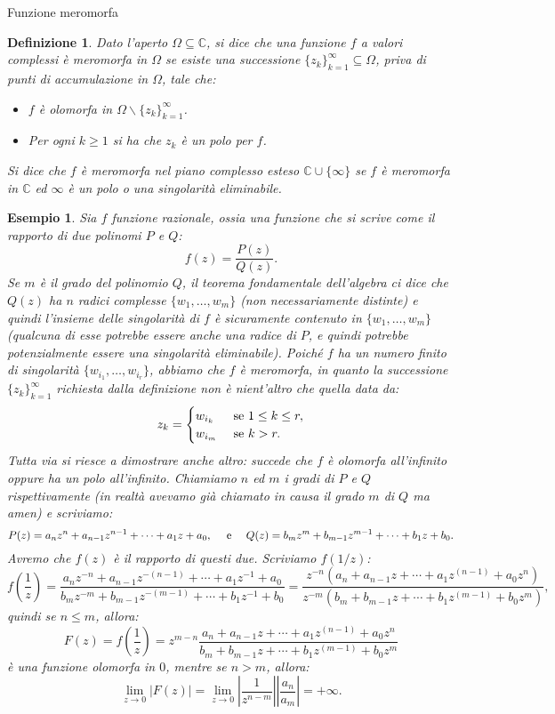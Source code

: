 \documentclass[11pt]{book}
\theoremstyle{Definizione}
\newtheorem*{mydef}{Definizione}
\theoremstyle{TeoremaProposizioneLemmaCorollarioCongettura}
\theoremstyle{OsservazioneNotaEsempio}
\newtheorem{myes}{Esempio}[section]
\newcommand{\C}{\mathbb{C}}
\newcommand{\tolto}{\smallsetminus}
\begin{document}
\begin{boxdef}{Funzione meromorfa}
\begin{mydef}
Dato l'aperto $\Omega \subseteq \C$, si dice che una funzione $f$ a valori complessi è meromorfa in $\Omega$ se esiste una successione $\{z_k\}_{k = 1}^\infty \subseteq \Omega$, priva di punti di accumulazione in $\Omega$, tale che:
\begin{itemize}
\item $f$ è olomorfa in $\Omega \tolto \{z_k\}_{k = 1}^\infty$.
\item Per ogni $k\geq 1$ si ha che $z_k$ è un polo per $f$.
\end{itemize}
Si dice che $f$ è meromorfa nel piano complesso esteso $\C \cup \{\infty\}$ se $f$ è meromorfa in $\C$ ed $\infty$ è un polo o una singolarità eliminabile.
\end{mydef}
\end{boxdef}
\begin{myes}
Sia $f$ funzione razionale, ossia una funzione che si scrive come il rapporto di due polinomi $P$ e $Q$:
$$
f(z) = \frac{P(z)}{Q(z)}.
$$
Se $m$ è il grado del polinomio $Q$, il teorema fondamentale dell'algebra ci dice che $Q(z)$ ha $n$ radici complesse $\{w_1,\dots,w_m\}$ (non necessariamente distinte) e quindi l'insieme delle singolarità di $f$ è sicuramente contenuto in $\{w_1,\dots,w_m\}$ (qualcuna di esse potrebbe essere anche una radice di $P$, e quindi potrebbe potenzialmente essere una singolarità eliminabile). Poiché $f$ ha un numero finito di singolarità $\{w_{i_1},\dots,w_{i_r}\}$, abbiamo che $f$ è meromorfa, in quanto la successione $\{z_k\}_{k = 1}^\infty$ richiesta dalla definizione non è nient'altro che quella data da:
$$
z_k = \begin{cases}
w_{i_k} &\textup{ se }1\leq k \leq r,\\
w_{i_m} &\textup{ se } k > r.
\end{cases}
$$
Tutta via si riesce a dimostrare anche altro: succede che $f$ è olomorfa all'infinito oppure ha un polo all'infinito. Chiamiamo $n$ ed $m$ i gradi di $P$ e $Q$ rispettivamente (in realtà avevamo già chiamato in causa il grado $m$ di $Q$ ma amen) e scriviamo:
$$
P(z) = a_n z^n + a_{n-1}z^{n-1} + \cdots + a_1 z + a_0,\quad \textup{ e }\quad Q(z) = b_mz^{m} + b_{m-1}z^{m-1} + \cdots + b_1 z + b_0.
$$
Avremo che $f(z)$ è il rapporto di questi due. Scriviamo $f(1/z)$:
$$
f\left(\frac{1}{z}\right) = \frac{a_n z^{-n} + a_{n-1}z^{-(n-1)} + \cdots +a_1 z^{-1} + a_0}{b_m z^{-m} + b_{m-1}z^{-(m-1)} + \cdots +b_1 z^{-1} + b_0} = \frac{z^{-n}(a_n + a_{n-1}z + \cdots + a_1 z^{(n-1)} + a_0 z^{n})}{z^{-m}(b_m + b_{m-1}z + \cdots + b_1 z^{(m-1)} + b_0 z^{m})},
$$
quindi se $n \leq m$, allora:
$$
F(z) = f\left(\frac{1}{z}\right) = z^{m-n} \frac{a_n + a_{n-1}z + \cdots + a_1 z^{(n-1)} + a_0 z^{n}}{b_m + b_{m-1}z + \cdots + b_1 z^{(m-1)} + b_0 z^{m}}
$$
è una funzione olomorfa in $0$, mentre se $n > m$, allora:
$$
\lim_{ z \to 0} |F(z)| = \lim_{z \to 0} \left|\frac{1}{z^{n-m}}\right|\left|\frac{a_n}{a_m}\right| = +\infty.
$$
\end{myes}
\end{document}
